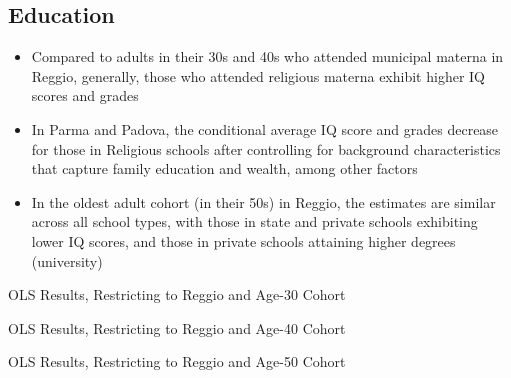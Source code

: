 \documentclass{beamer}
\begin{document}
\subsection{Education}
\begin{frame}
\begin{itemize} \frametitle{Education}
\item Compared to adults in their 30s and 40s who attended municipal materna in Reggio, generally, those who attended religious materna exhibit higher IQ scores and grades
\item In Parma and Padova, the conditional average IQ score and grades decrease for those in Religious schools after controlling for background characteristics that capture family education and wealth, among other factors
\item In the oldest adult cohort (in their 50s) in Reggio, the estimates are similar across all school types, with those in state and private schools exhibiting lower IQ scores, and those in private schools attaining higher degrees (university)
\end{itemize}
\end{frame}



\begin{frame}
\begin{table}[H]
\begin{center}
	\caption{OLS Results, Restricting to Reggio and Age-30 Cohort} \label{table:OLS-R30-E}
	\scalebox{0.52}{
		
	}
	\end{center}

\end{table}
\end{frame}

\begin{frame}
\begin{table}[H]
\begin{center}
	\caption{OLS Results, Restricting to Reggio and Age-40 Cohort} \label{table:OLS-R40-E}
	\scalebox{0.5}{
		
	}
	\end{center}
\end{table}
\end{frame}

\begin{frame}
\begin{table}[H]
\begin{center}
	\caption{OLS Results, Restricting to Reggio and Age-50 Cohort} \label{table:OLS-R50-E}
	\scalebox{0.5}{
		
	}
	\end{center}
\end{table}
\end{frame}
\end{document}
